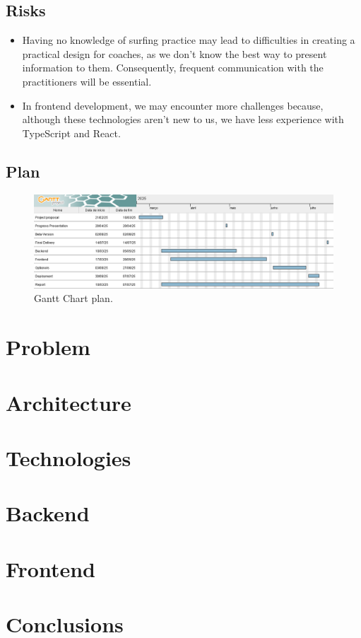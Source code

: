 \documentclass[a4paper,twoside,11pt]{article}
\begin{document}
\subsection{Risks}
\begin{itemize}
\item Having no knowledge of surfing practice may lead to difficulties in creating a practical design for coaches, as we don’t know the best way to present information to them. Consequently, frequent communication with the practitioners will be essential.
\item In frontend development, we may encounter more challenges because, although these technologies aren't new to us, we have less experience with TypeScript and React.
\end{itemize}

\subsection{Plan}
\begin{figure}[h]
\centering
\includegraphics [width=6in]{GanttChart.png}
\caption{Gantt Chart plan.}
\end{figure}

\section{Problem}

\section{Architecture}

\section{Technologies}

\section{Backend}

\section{Frontend}

\section{Conclusions}



\end{document}
